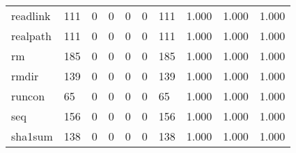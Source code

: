 \begin{longtable}{lp{1.3cm}p{1.3cm}p{1.3cm}p{1.3cm}p{1.3cm}p{1.3cm}p{1.3cm}p{1.3cm}p{1.3cm}}
readlink  &                    111 &                                             0 &                                            0 &                                           0 &                                            0 &                                        111 &                                1.000 &                                  1.000 &                                1.000 \\
realpath  &                    111 &                                             0 &                                            0 &                                           0 &                                            0 &                                        111 &                                1.000 &                                  1.000 &                                1.000 \\
rm        &                    185 &                                             0 &                                            0 &                                           0 &                                            0 &                                        185 &                                1.000 &                                  1.000 &                                1.000 \\
rmdir     &                    139 &                                             0 &                                            0 &                                           0 &                                            0 &                                        139 &                                1.000 &                                  1.000 &                                1.000 \\
runcon    &                     65 &                                             0 &                                            0 &                                           0 &                                            0 &                                         65 &                                1.000 &                                  1.000 &                                1.000 \\
seq       &                    156 &                                             0 &                                            0 &                                           0 &                                            0 &                                        156 &                                1.000 &                                  1.000 &                                1.000 \\
sha1sum   &                    138 &                                             0 &                                            0 &                                           0 &                                            0 &                                        138 &                                1.000 &                                  1.000 &                                1.000 \\

\end{longtable}

